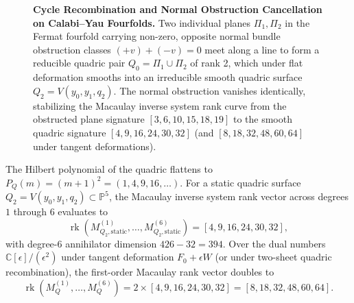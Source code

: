 \documentclass[11pt,a4paper]{article}
\theoremstyle{definition}
\theoremstyle{remark}
\DeclareMathOperator{\rk}{rk}
\begin{document}
\begin{figure}[htbp]
\caption{\textbf{Cycle Recombination and Normal Obstruction Cancellation on Calabi--Yau Fourfolds.} Two individual planes $\Pi_1, \Pi_2$ in the Fermat fourfold carrying non-zero, opposite normal bundle obstruction classes $(+v) + (-v) = 0$ meet along a line to form a reducible quadric pair $Q_0 = \Pi_1 \cup \Pi_2$ of rank 2, which under flat deformation smooths into an irreducible smooth quadric surface $Q_2 = V(y_0, y_1, q_2)$. The normal obstruction vanishes identically, stabilizing the Macaulay inverse system rank curve from the obstructed plane signature $[3, 6, 10, 15, 18, 19]$ to the smooth quadric signature $[4, 9, 16, 24, 30, 32]$ (and $[8, 18, 32, 48, 60, 64]$ under tangent deformations).}
\label{fig:quadric_recombination}
\end{figure}

The Hilbert polynomial of the quadric flattens to $P_Q(m) = (m+1)^2 = (1, 4, 9, 16, \dots)$. For a static quadric surface $Q_2 = V(y_0, y_1, q_2) \subset \mathbb{P}^5$, the Macaulay inverse system rank vector across degrees $1$ through $6$ evaluates to
\begin{equation}
\label{eq:quadric_static_macaulay}
\rk \left( M_{Q_2, \mathrm{static}}^{(1)}, \dots, M_{Q_2, \mathrm{static}}^{(6)} \right) = [4, 9, 16, 24, 30, 32],
\end{equation}
with degree-6 annihilator dimension $426 - 32 = 394$. Over the dual numbers $\mathbb{C}[\epsilon]/(\epsilon^2)$ under tangent deformation $F_0 + \epsilon W$ (or under two-sheet quadric recombination), the first-order Macaulay rank vector doubles to
\begin{equation}
\label{eq:quadric_recomb_macaulay}
\rk \left( M_Q^{(1)}, \dots, M_Q^{(6)} \right) = 2 \times [4, 9, 16, 24, 30, 32] = [8, 18, 32, 48, 60, 64].
\end{equation}
\end{document}
